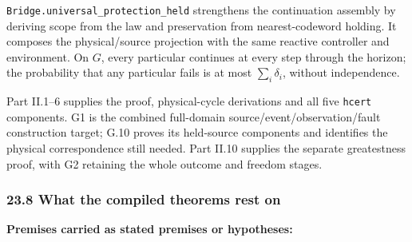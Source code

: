 \documentclass[
]{article}
\begin{document}
\texttt{B\allowbreak{}r\allowbreak{}i\allowbreak{}d\allowbreak{}g\allowbreak{}e\allowbreak{}.\allowbreak{}u\allowbreak{}n\allowbreak{}i\allowbreak{}v\allowbreak{}e\allowbreak{}r\allowbreak{}s\allowbreak{}a\allowbreak{}l\allowbreak{}\_\allowbreak{}p\allowbreak{}r\allowbreak{}o\allowbreak{}t\allowbreak{}e\allowbreak{}c\allowbreak{}t\allowbreak{}i\allowbreak{}o\allowbreak{}n\allowbreak{}\_\allowbreak{}h\allowbreak{}e\allowbreak{}l\allowbreak{}d}
strengthens the continuation assembly by deriving scope from the law and
preservation from nearest-codeword holding. It composes the
p\allowbreak{}h\allowbreak{}y\allowbreak{}s\allowbreak{}i\allowbreak{}c\allowbreak{}a\allowbreak{}l\allowbreak{}/\allowbreak{}s\allowbreak{}o\allowbreak{}u\allowbreak{}r\allowbreak{}c\allowbreak{}e
projection with the same reactive controller and environment. On \(G\),
every particular continues at every step through the horizon; the
probability that any particular fails is at most \(\sum_i\delta_i\),
without independence.

Part II.1--6 supplies the proof, physical-cycle derivations and all five
\texttt{hcert} components. G1 is the combined full-domain
s\allowbreak{}o\allowbreak{}u\allowbreak{}r\allowbreak{}c\allowbreak{}e\allowbreak{}/\allowbreak{}e\allowbreak{}v\allowbreak{}e\allowbreak{}n\allowbreak{}t\allowbreak{}/\allowbreak{}o\allowbreak{}b\allowbreak{}s\allowbreak{}e\allowbreak{}r\allowbreak{}v\allowbreak{}a\allowbreak{}t\allowbreak{}i\allowbreak{}o\allowbreak{}n\allowbreak{}/\allowbreak{}f\allowbreak{}a\allowbreak{}u\allowbreak{}l\allowbreak{}t
construction target; G.10 proves its held-source components and
identifies the physical correspondence still needed. Part II.10 supplies
the separate greatestness proof, with G2 retaining the whole outcome and
freedom stages.

\subsubsection{23.8 What the compiled theorems rest
on}\label{what-the-compiled-theorems-rest-on}

\textbf{Premises carried as stated premises or hypotheses:}
\end{document}
